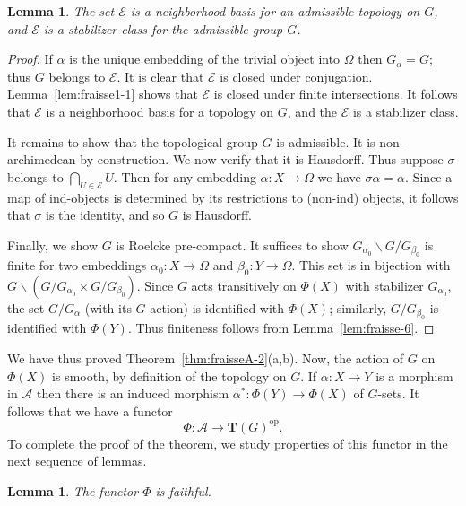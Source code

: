 \documentclass[12pt]{amsart}
\numberwithin{equation}{section}
\newtheorem{lemma}[equation]{Lemma}
\theoremstyle{definition}
\newcommand{\cA}{\mathcal{A}}
\newcommand{\sE}{\mathscr{E}}
\newcommand{\bT}{\mathbf{T}}
\newcommand{\op}{\mathrm{op}}
\begin{document}
\begin{lemma} \label{lem:fraisse1-2}
The set $\sE$ is a neighborhood basis for an admissible topology on $G$, and $\sE$ is a stabilizer class for the admissible group $G$.
\end{lemma}

\begin{proof}
If $\alpha$ is the unique embedding of the trivial object into $\Omega$ then $G_{\alpha}=G$; thus $G$ belongs to $\sE$. It is clear that $\sE$ is closed under conjugation. Lemma~\ref{lem:fraisse1-1} shows that $\sE$ is closed under finite intersections. It follows that $\sE$ is a neighborhood basis for a topology on $G$, and the $\sE$ is a stabilizer class.

It remains to show that the topological group $G$ is admissible. It is non-archimedean by construction. We now verify that it is Hausdorff. Thus suppose $\sigma$ belongs to $\bigcap_{U \in \sE} U$. Then for any embedding $\alpha \colon X \to \Omega$ we have $\sigma \alpha=\alpha$. Since a map of ind-objects is determined by its restrictions to (non-ind) objects, it follows that $\sigma$ is the identity, and so $G$ is Hausdorff.

Finally, we show $G$ is Roelcke pre-compact. It suffices to show $G_{\alpha_0} \backslash G / G_{\beta_0}$ is finite for two embeddings $\alpha_0 \colon X \to \Omega$ and $\beta_0 \colon Y \to \Omega$. This set is in bijection with $G \backslash (G/G_{\alpha_0} \times G/G_{\beta_0})$. Since $G$ acts transitively on $\Phi(X)$ with stabilizer $G_{\alpha_0}$, the set $G/G_{\alpha}$ (with its $G$-action) is identified with $\Phi(X)$; similarly, $G/G_{\beta_0}$ is identified with $\Phi(Y)$. Thus finiteness follows from Lemma~\ref{lem:fraisse-6}.
\end{proof}

We have thus proved Theorem~\ref{thm:fraisseA-2}(a,b). Now, the action of $G$ on $\Phi(X)$ is smooth, by definition of the topology on $G$. If $\alpha \colon X \to Y$ is a morphism in $\cA$ then there is an induced morphism $\alpha^* \colon \Phi(Y) \to \Phi(X)$ of $G$-sets. It follows that we have a functor
\begin{displaymath}
\Phi \colon \cA \to \bT(G)^{\op}.
\end{displaymath}
To complete the proof of the theorem, we study properties of this functor in the next sequence of lemmas.

\begin{lemma}
The functor $\Phi$ is faithful.
\end{lemma}
\end{document}
